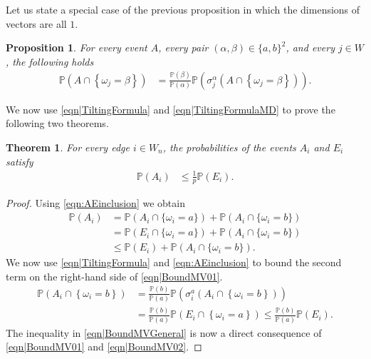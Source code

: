 \documentclass[reqno]{amsart}
\newtheorem{proposition}{Proposition}
\newtheorem{theorem}{Theorem}
\begin{document}
Let us state a special case of the previous proposition in which the dimensions of vectors are all $1$. 
\begin{proposition}\label{thm|TiltingLemma}
For every event $A$, every pair $(\alpha,\beta)\in\{a,b\}^2$, and every $j\in W$, the following holds 
\begin{align}
\mathbb P\left(A\cap \left\{\omega_j=\beta\right\}\right)&=\frac{\mathbb P(\beta)}{\mathbb P(\alpha)} \mathbb P\left( 
\sigma_j^{\alpha}\left(
A\cap \left\{\omega_j=\beta\right\}\right)\right).
 \label{eqn|TiltingFormula} 
\end{align}
\end{proposition}

We now use \eqref{eqn|TiltingFormula} and \eqref{eqn|TiltingFormulaMD}  to prove the following two theorems.

\begin{theorem}\label{thm|BoundMVGeneral} For every edge $i\in W_n$, the probabilities of the events $A_i$ and $E_i$ satisfy 
\begin{align}
\mathbb P\left(A_i\right)&\leq \frac1{  p}\mathbb P(E_i). \label{eqn|BoundMVGeneral}
\end{align}
\end{theorem}

\begin{proof} Using \eqref{eqn:AEinclusion} we obtain 
\begin{align}
\mathbb P\left(A_i\right)&=\mathbb P\left(A_i\cap \{\omega_i=a\}\right)+\mathbb P\left(A_i\cap \{\omega_i=b\}\right) \nonumber \\
&=\mathbb P\left(E_i\cap \{\omega_i=a\}\right)+\mathbb P\left(A_i\cap \{\omega_i=b\}\right)\nonumber\\
&\leq \mathbb P\left(E_i\right)+\mathbb P\left(A_i\cap \{\omega_i=b\}\right)
. \label{eqn|BoundMV01}
\end{align}
We now use \eqref{eqn|TiltingFormula} and \eqref{eqn:AEinclusion} to bound the second term on the right-hand side of \eqref{eqn|BoundMV01}.
\begin{align}
\mathbb P\left(A_i \cap\left\{\omega_i=b\right\}\right)&=\frac{\mathbb P(b)}{\mathbb P(a)}
\mathbb P\left(\sigma_i^a\left(A_i \cap\left\{\omega_i=b\right\}\right)\right)\nonumber \\ & = \frac{\mathbb P(b)}{\mathbb P(a)}
\mathbb P\left(E_i \cap\left\{\omega_i=a\right\}\right)\leq \frac{\mathbb P(b)}{\mathbb P(a)}
\mathbb P\left(E_i \right). \label{eqn|BoundMV02}
\end{align}
The inequality in \eqref{eqn|BoundMVGeneral} is now a direct consequence of \eqref{eqn|BoundMV01} and \eqref{eqn|BoundMV02}.
\end{proof}
\end{document}

